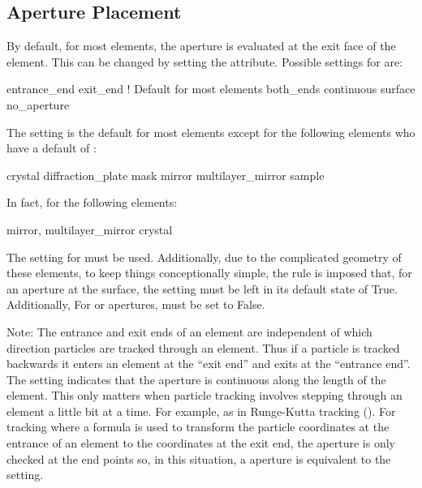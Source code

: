 \subsection{Aperture Placement}
\label{s:ap.place}

By default, for most elements, the aperture is evaluated at the exit face of the
element. This can be changed by setting the  attribute.
Possible settings for  are:
\begin{example}
  entrance_end
  exit_end       ! Default for most elements
  both_ends
  continuous
  surface  
  no_aperture
\end{example}
The  setting is the default for most elements except for
the following elements who have a default of :
\begin{example}
  crystal
  diffraction_plate
  mask
  mirror
  multilayer_mirror
  sample
\end{example}

In fact, for the following elements:
\begin{example}
  mirror, 
  multilayer_mirror
  crystal
\end{example}
The  setting for  must be used.
Additionally, due to the complicated geometry of these elements, to
keep things conceptionally simple, the rule is imposed that, for an
aperture at the surface, the  setting must
be left in its default state of True. Additionally, For
 or  apertures,
 must be set to False.

Note: The entrance and exit ends of an element are independent of
which direction particles are tracked through an element. Thus if a
particle is tracked backwards it enters an element at the ``exit end''
and exits at the ``entrance end''. The  setting
indicates that the aperture is continuous along the length of the
element. This only matters when particle tracking involves stepping
through an element a little bit at a time. For example, as in
Runge-Kutta tracking (). For tracking where a formula is
used to transform the particle coordinates at the entrance of an
element to the coordinates at the exit end, the aperture is only
checked at the end points so, in this situation, a 
aperture is equivalent to the  setting.

